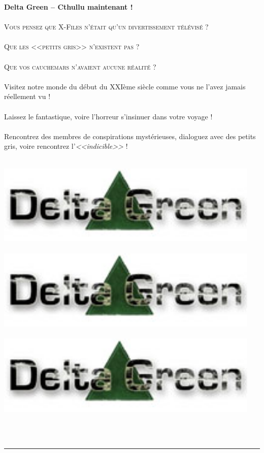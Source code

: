 \documentclass[40pt,twoside,a4paper]{article}
\begin{document}
\begin{minipage}[ht]{0.65\textwidth}
	\textbf{\huge Delta Green -- Cthullu maintenant !} ~\\~\\
	\textsc{\LARGE Vous pensez que X-Files n'{\'e}tait qu'un divertissement t{\'e}l{\'e}vis{\'e} ?}~\\~\\
	\textsc{\LARGE Que les <<petits gris>>  n'existent pas ?}~\\~\\
	\textsc{\LARGE Que vos cauchemars n'avaient aucune r{\'e}alit{\'e} ?}~\\~\\
	
	{\Large
		Visitez notre monde du d{\'e}but du XXI{\`e}me si{\`e}cle comme vous ne l'avez jamais r{\'e}ellement vu !~\\~\\
		Laissez le fantastique, voire l'horreur s'insinuer dans votre voyage !~\\~\\
		Rencontrez des membres de conspirations myst{\'e}rieuses, dialoguez avec des petits gris, voire rencontrez l'\emph{<<indicible>>} !~\\~\\
	}

\end{minipage} \hfill \begin{minipage}[ht]{0.30\textwidth}
	\includegraphics[width=0.95\textwidth]{../img/logo_DG.jpg} ~\\~\\
	\includegraphics[width=0.95\textwidth]{../img/logo_DG.jpg} ~\\~\\
	\includegraphics[width=0.95\textwidth]{../img/logo_DG.jpg} ~\\~\\
\end{minipage} ~\\

\hrule

~\\
\end{document}
